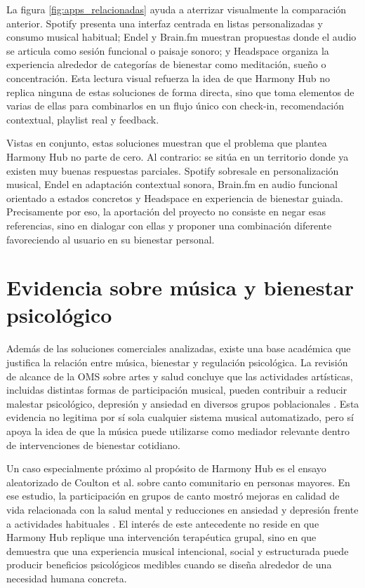 La figura \ref{fig:apps_relacionadas} ayuda a aterrizar visualmente la comparación anterior. Spotify presenta una interfaz centrada en listas personalizadas y consumo musical habitual; Endel y Brain.fm muestran propuestas donde el audio se articula como sesión funcional o paisaje sonoro; y Headspace organiza la experiencia alrededor de categorías de bienestar como meditación, sueño o concentración. Esta lectura visual refuerza la idea de que Harmony Hub no replica ninguna de estas soluciones de forma directa, sino que toma elementos de varias de ellas para combinarlos en un flujo único con check-in, recomendación contextual, playlist real y feedback.

Vistas en conjunto, estas soluciones muestran que el problema que plantea Harmony Hub no parte de cero. Al contrario: se sitúa en un territorio donde ya existen muy buenas respuestas parciales. Spotify sobresale en personalización musical, Endel en adaptación contextual sonora, Brain.fm en audio funcional orientado a estados concretos y Headspace en experiencia de bienestar guiada. Precisamente por eso, la aportación del proyecto no consiste en negar esas referencias, sino en dialogar con ellas y proponer una combinación diferente favoreciendo al usuario en su bienestar personal.

\section{Evidencia sobre música y bienestar psicológico}
\label{sec:evidencia_musica_bienestar}

Además de las soluciones comerciales analizadas, existe una base académica que
justifica la relación entre música, bienestar y regulación psicológica. La
revisión de alcance de la OMS sobre artes y salud concluye que las actividades
artísticas, incluidas distintas formas de participación musical, pueden
contribuir a reducir malestar psicológico, depresión y ansiedad en diversos
grupos poblacionales \cite{who_arts_2019}. Esta evidencia no legitima por sí
sola cualquier sistema musical automatizado, pero sí apoya la idea de que la
música puede utilizarse como mediador relevante dentro de intervenciones de
bienestar cotidiano.

Un caso especialmente próximo al propósito de Harmony Hub es el ensayo
aleatorizado de Coulton et al. sobre canto comunitario en personas mayores. En
ese estudio, la participación en grupos de canto mostró mejoras en calidad de
vida relacionada con la salud mental y reducciones en ansiedad y depresión
frente a actividades habituales \cite{coulton_2015}. El interés de este
antecedente no reside en que Harmony Hub replique una intervención terapéutica
grupal, sino en que demuestra que una experiencia musical intencional, social y
estructurada puede producir beneficios psicológicos medibles cuando se diseña
alrededor de una necesidad humana concreta.


